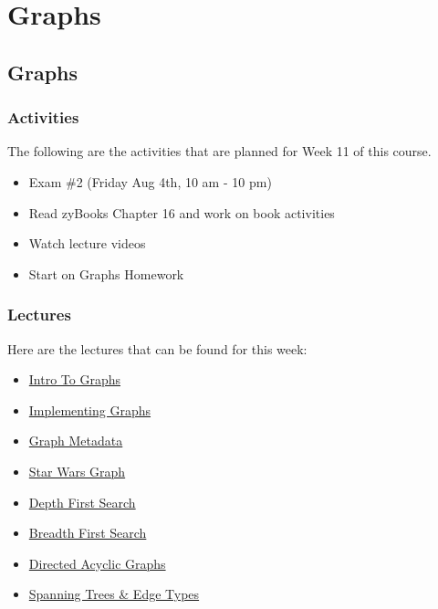 \clearpage

\renewcommand{\ChapTitle}{Graphs}

\chapter{\ChapTitle}
\section{\ChapTitle}

\subsection{Activities}

The following are the activities that are planned for Week 11 of this course.

\begin{itemize}
    \item Exam \#2 (Friday Aug 4th, 10 am - 10 pm)
    \item Read zyBooks Chapter 16 and work on book activities
    \item Watch lecture videos
    \item Start on Graphs Homework
\end{itemize}

\subsection{Lectures}

Here are the lectures that can be found for this week:

\begin{itemize}
    \item \href{https://applied.cs.colorado.edu/mod/hvp/view.php?id=46043}{Intro To Graphs}
    \item \href{https://applied.cs.colorado.edu/mod/hvp/view.php?id=46044}{Implementing Graphs}
    \item \href{https://applied.cs.colorado.edu/mod/hvp/view.php?id=46045}{Graph Metadata}
    \item \href{https://applied.cs.colorado.edu/mod/hvp/view.php?id=46046}{Star Wars Graph}
    \item \href{https://applied.cs.colorado.edu/mod/hvp/view.php?id=46047}{Depth First Search}
    \item \href{https://applied.cs.colorado.edu/mod/hvp/view.php?id=46048}{Breadth First Search}
    \item \href{https://applied.cs.colorado.edu/mod/hvp/view.php?id=46049}{Directed Acyclic Graphs}
    \item \href{https://applied.cs.colorado.edu/mod/hvp/view.php?id=46050}{Spanning Trees \& Edge Types}
\end{itemize}

